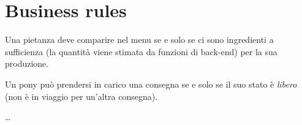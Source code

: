 \section{Business rules} \label{sec:businessrules}
\begin{enumbusinessrules}
\item Una pietanza deve comparire nel menu se e solo se ci sono ingredienti a sufficienza (la quantità viene stimata da funzioni di back-end) per la sua produzione.
\item Un pony può prendersi in carico una consegna se e solo se il suo stato è {\it libero} (non è in viaggio per un'altra consegna).
\item \ldots
\end{enumbusinessrules}
